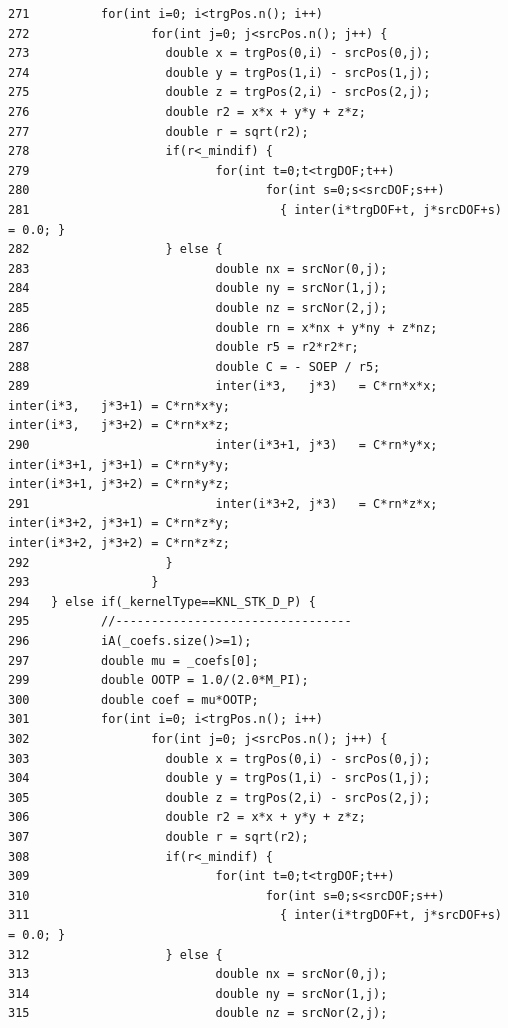\begin{verbatim}
271          for(int i=0; i<trgPos.n(); i++)
272                 for(int j=0; j<srcPos.n(); j++) {
273                   double x = trgPos(0,i) - srcPos(0,j);
274                   double y = trgPos(1,i) - srcPos(1,j);
275                   double z = trgPos(2,i) - srcPos(2,j);
276                   double r2 = x*x + y*y + z*z;
277                   double r = sqrt(r2);
278                   if(r<_mindif) {
279                          for(int t=0;t<trgDOF;t++)
280                                 for(int s=0;s<srcDOF;s++)
281                                   { inter(i*trgDOF+t, j*srcDOF+s) = 0.0; }
282                   } else {
283                          double nx = srcNor(0,j);
284                          double ny = srcNor(1,j);
285                          double nz = srcNor(2,j);
286                          double rn = x*nx + y*ny + z*nz;
287                          double r5 = r2*r2*r;
288                          double C = - SOEP / r5;
289                          inter(i*3,   j*3)   = C*rn*x*x;                                  inter(i*3,   j*3+1) = C*rn*x*y;                                 inter(i*3,   j*3+2) = C*rn*x*z;
290                          inter(i*3+1, j*3)   = C*rn*y*x;                                  inter(i*3+1, j*3+1) = C*rn*y*y;                                 inter(i*3+1, j*3+2) = C*rn*y*z;
291                          inter(i*3+2, j*3)   = C*rn*z*x;                                  inter(i*3+2, j*3+1) = C*rn*z*y;                                 inter(i*3+2, j*3+2) = C*rn*z*z;
292                   }
293                 }
294   } else if(_kernelType==KNL_STK_D_P) {
295          //---------------------------------
296          iA(_coefs.size()>=1);
297          double mu = _coefs[0];
299          double OOTP = 1.0/(2.0*M_PI);
300          double coef = mu*OOTP;
301          for(int i=0; i<trgPos.n(); i++)
302                 for(int j=0; j<srcPos.n(); j++) {
303                   double x = trgPos(0,i) - srcPos(0,j);
304                   double y = trgPos(1,i) - srcPos(1,j);
305                   double z = trgPos(2,i) - srcPos(2,j);
306                   double r2 = x*x + y*y + z*z;
307                   double r = sqrt(r2);
308                   if(r<_mindif) {
309                          for(int t=0;t<trgDOF;t++)
310                                 for(int s=0;s<srcDOF;s++)
311                                   { inter(i*trgDOF+t, j*srcDOF+s) = 0.0; }
312                   } else {
313                          double nx = srcNor(0,j);
314                          double ny = srcNor(1,j);
315                          double nz = srcNor(2,j);

\end{verbatim}
